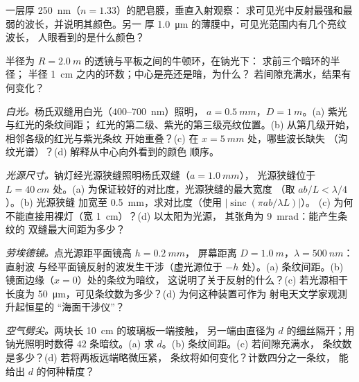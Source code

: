 \begin{exercise}[$\star$]\label{exo:b2:two-wave-interference:3}
一层厚 \qty{250}{nm}（$n = 1.33$）的肥皂膜，垂直入射观察：
求可见光中反射最强和最弱的波长，并说明其颜色。另一
厚 \qty{1.0}{\micro m} 的薄膜中，可见光范围内有几个亮纹波长，
人眼看到的是什么颜色？
\end{exercise}

\begin{exercise}[$\star$]\label{exo:b2:two-wave-interference:4}
半径为 $R = \qty{2.0}{m}$ 的透镜与平板之间的牛顿环，在钠光下：
求前三个暗环的半径；
半径 \qty{1}{cm} 之内的环数；中心是亮还是暗，为什么？
若间隙充满水，结果有何变化？
\end{exercise}

\begin{exercise}[$\star\star$]\label{exo:b2:two-wave-interference:5}
\emph{白光。}杨氏双缝用白光（$400$--\qty{700}{nm}）照明，
$a = \qty{0.5}{mm}$，$D = \qty{1}{m}$。(a) 紫光与红光的条纹间距；
红光的第二级、紫光的第三级亮纹位置。(b)
从第几级开始，相邻各级的红光与紫光条纹
开始重叠？(c) 在 $x = \qty{5}{mm}$ 处，哪些波长缺失
（沟纹光谱）？(d) 解释从中心向外看到的颜色
顺序。
\end{exercise}

\begin{exercise}[$\star\star$]\label{exo:b2:two-wave-interference:6}
\emph{光源尺寸。}钠灯经光源狭缝照明杨氏双缝（$a = \qty{1.0}{mm}$），
光源狭缝位于 $L = \qty{40}{cm}$ 处。(a) 为保证较好的对比度，光源狭缝的最大宽度
（取 $ab/L < \lambda/4$）。(b) 光源狭缝
加宽至 \qty{0.5}{mm}，求对比度（使用 $|\operatorname{sinc}(\pi ab/\lambda L)|$）。
(c) 为何不能直接用裸灯（宽 \qty{1}{cm}）？(d) 以太阳为光源，
其张角为 \qty{9}{mrad}：能产生条纹的
双缝最大间距为多少？
\end{exercise}

\begin{exercise}[$\star\star$]\label{exo:b2:two-wave-interference:7}
\emph{劳埃德镜。}点光源距平面镜高 $h = \qty{0.2}{mm}$，
屏幕距离 $D = \qty{1.0}{m}$，$\lambda = \qty{500}{nm}$：直射波
与经平面镜反射的波发生干涉（虚光源位于
$-h$ 处）。(a) 条纹间距。(b) 镜面边缘（$x = 0$）处的条纹为暗纹，
这说明了关于反射的什么？(c) 若光源相干长度为
\qty{50}{\micro m}，可见条纹数为多少？(d) 为何这种装置可作为
射电天文学家观测升起恒星的
“海面干涉仪”？
\end{exercise}

\begin{exercise}[$\star\star$]\label{exo:b2:two-wave-interference:8}
\emph{空气劈尖。}两块长 \qty{10}{cm} 的玻璃板一端接触，
另一端由直径为 $d$ 的细丝隔开；用钠光照明时数得
$42$ 条暗纹。(a) 求 $d$。(b) 条纹间距。(c) 若间隙充满水，
条纹数是多少？(d) 若将两板远端略微压紧，
条纹将如何变化？计数四分之一条纹，
能给出 $d$ 的何种精度？
\end{exercise}

